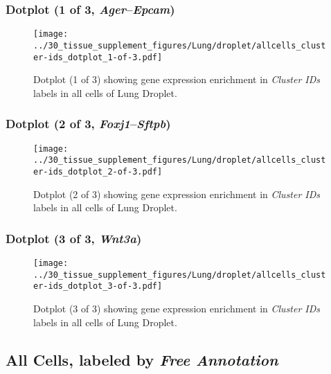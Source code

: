 \clearpage

\subsubsection{Dotplot (1 of 3, \emph{Ager}--\emph{Epcam})}
\begin{figure}[h]
\centering
\texttt{[image: ../30\_tissue\_supplement\_figures/Lung/droplet/allcells\_cluster-ids\_dotplot\_1-of-3.pdf]}

\caption{ Dotplot (1 of 3)  showing gene expression enrichment in \emph{Cluster IDs} labels in all cells of Lung Droplet. }
\end{figure}


\clearpage

\subsubsection{Dotplot (2 of 3, \emph{Foxj1}--\emph{Sftpb})}
\begin{figure}[h]
\centering
\texttt{[image: ../30\_tissue\_supplement\_figures/Lung/droplet/allcells\_cluster-ids\_dotplot\_2-of-3.pdf]}

\caption{ Dotplot (2 of 3)  showing gene expression enrichment in \emph{Cluster IDs} labels in all cells of Lung Droplet. }
\end{figure}


\clearpage

\subsubsection{Dotplot (3 of 3, \emph{Wnt3a})}
\begin{figure}[h]
\centering
\texttt{[image: ../30\_tissue\_supplement\_figures/Lung/droplet/allcells\_cluster-ids\_dotplot\_3-of-3.pdf]}

\caption{ Dotplot (3 of 3)  showing gene expression enrichment in \emph{Cluster IDs} labels in all cells of Lung Droplet. }
\end{figure}


\clearpage

\subsection{All Cells, labeled by \emph{Free Annotation}}
